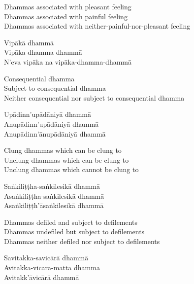 \begin{english-verses}
  Dhammas associated with pleasant feeling\\
  Dhammas associated with painful feeling\\
  Dhammas associated with neither-painful-nor-pleasant feeling
\end{english-verses}

\begin{pali-hang-continued}
  Vipākā dhammā\\
  Vipāka-dhamma-dhammā\\
  N'eva vipāka na vipāka-dhamma-dhammā
\end{pali-hang-continued}

\begin{english-verses}
  Consequential dhamma\\
  Subject to consequential dhamma\\
  Neither consequential nor subject to consequential dhamma
\end{english-verses}

\begin{pali-hang-continued}
  Upādinn'upādāniyā dhammā\\
  Anupādinn'upādāniyā dhammā\\
  Anupādinn'ānupādāniyā dhammā
\end{pali-hang-continued}

\begin{english-verses}
  Clung dhammas which can be clung to\\
  Unclung dhammas which can be clung to\\
  Unclung dhammas which cannot be clung to
\end{english-verses}

\begin{pali-hang-continued}
  Saṅkiliṭṭha-saṅkilesikā dhammā\\
  Asaṅkiliṭṭha-saṅkilesikā dhammā\\
  Asaṅkiliṭṭh'āsaṅkilesikā dhammā
\end{pali-hang-continued}

\begin{english-verses}
  Dhammas defiled and subject to defilements\\
  Dhammas undefiled but subject to defilements\\
  Dhammas neither defiled nor subject to defilements
\end{english-verses}

\begin{pali-hang-continued}
  Savitakka-savicārā dhammā\\
  Avitakka-vicāra-mattā dhammā\\
  Avitakk'āvicārā dhammā
\end{pali-hang-continued}

